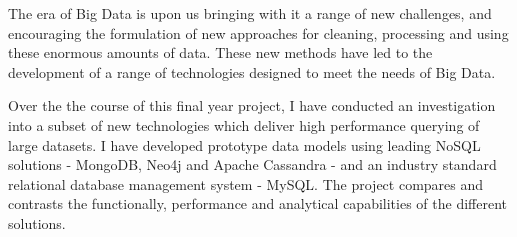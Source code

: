The era of Big Data is upon us bringing with it a range of new challenges, and encouraging the formulation of new approaches for cleaning, processing and using these enormous amounts of data. These new methods have led to the development of a range of technologies designed to meet the needs of Big Data.

Over the the course of this final year project, I have conducted an investigation into a subset of new technologies which deliver high performance querying of large datasets. I have developed prototype data models using leading NoSQL solutions - MongoDB, Neo4j and Apache Cassandra - and an industry standard relational database management system - MySQL. The project compares and contrasts the functionally, performance and analytical capabilities of the different solutions.